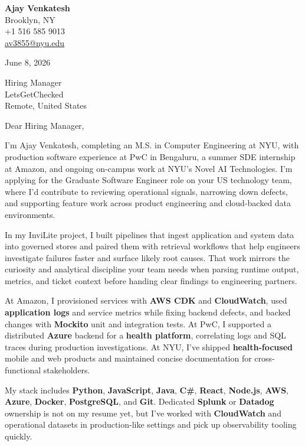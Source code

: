 \documentclass[letterpaper,11pt]{article}
\begin{document}
\begin{flushleft}
\textbf{\large Ajay Venkatesh} \\
Brooklyn, NY \\
+1 516 585 9013 \\
\href{mailto:av3855@nyu.edu}{av3855@nyu.edu}
\end{flushleft}
\vspace{10pt}
June 8, 2026
\vspace{6pt}

Hiring Manager \\
LetsGetChecked \\
Remote, United States

\vspace{10pt}

Dear Hiring Manager,

I'm Ajay Venkatesh, completing an M.S. in Computer Engineering at NYU, with production software experience at PwC in Bengaluru, a summer SDE internship at Amazon, and ongoing on-campus work at NYU's Novel AI Technologies. I'm applying for the Graduate Software Engineer role on your US technology team, where I'd contribute to reviewing operational signals, narrowing down defects, and supporting feature work across product engineering and cloud-backed data environments.

In my InviLite project, I built pipelines that ingest application and system data into governed stores and paired them with retrieval workflows that help engineers investigate failures faster and surface likely root causes. That work mirrors the curiosity and analytical discipline your team needs when parsing runtime output, metrics, and ticket context before handing clear findings to engineering partners.

At Amazon, I provisioned services with \textbf{AWS CDK} and \textbf{CloudWatch}, used \textbf{application logs} and service metrics while fixing backend defects, and backed changes with \textbf{Mockito} unit and integration tests. At PwC, I supported a distributed \textbf{Azure} backend for a \textbf{health platform}, correlating logs and SQL traces during production investigations. At NYU, I've shipped \textbf{health-focused} mobile and web products and maintained concise documentation for cross-functional stakeholders.

My stack includes \textbf{Python}, \textbf{JavaScript}, \textbf{Java}, \textbf{C\#}, \textbf{React}, \textbf{Node.js}, \textbf{AWS}, \textbf{Azure}, \textbf{Docker}, \textbf{PostgreSQL}, and \textbf{Git}. Dedicated \textbf{Splunk} or \textbf{Datadog} ownership is not on my resume yet, but I've worked with \textbf{CloudWatch} and operational datasets in production-like settings and pick up observability tooling quickly.
\end{document}
